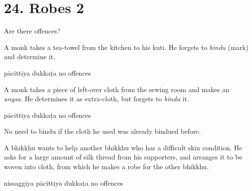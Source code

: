 \chapter{24. Robes 2}
\renewcommand*{\theChapterTitle}{24. Robes 2}

\begin{exam}{\autoExamName}

  \begin{problem*}

    Are there offences?

    \begin{parts}

      \item A monk takes a tea-towel from the kitchen to his kuti.
      He forgets to \emph{bindu} (mark) and determine it.

      \bigskip

      \begin{answers}{3}
        \bChoices
         pācittiya\eAns
         dukkaṭa\eAns
         no offences\eAns
        \eChoices
      \end{answers}

      \bigskip

      \item A monk takes a piece of left-over cloth from the sewing room and
      makes an \emph{angsa}. He determines it as extra-cloth, but forgets to \emph{bindu} it.

      \bigskip

      \begin{answers}{3}
        \bChoices
         pācittiya\eAns
         dukkaṭa\eAns
         no offences\eAns
        \eChoices
      \end{answers}

      \begin{solution}
        No need to bindu if the cloth he used was already bindued before.
      \end{solution}

      \bigskip

      \item A bhikkhu wants to help another bhikkhu who has a difficult skin
      condition. He asks for a large amount of silk thread from his supporters,
      and arranges it to be woven into cloth, from which he makes a robe for the
      other bhikkhu.

      \bigskip

      \begin{answers}{3}
        \bChoices
         nissaggiya pācittiya\eAns
         dukkaṭa\eAns
         no offences\eAns
        \eChoices
      \end{answers}


\end{parts}
\end{problem*}
\end{exam}
